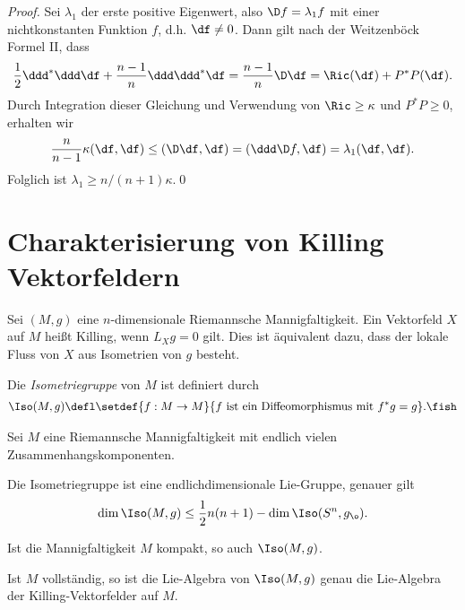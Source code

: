 \documentclass[%
	paper=a5,%
	fleqn,%
	DIV=18,%
	BCOR=0mm,
	fontsize=11pt,
	titlepage=false,%
	bibliography=totoc,
	DIV=18,%
	twoside=true,
	pdftitle=Riemannsche Geometrie,
	pdfauthor=Uwe Semmelmann,
	numbers=noendperiod]%
	{scrbook}
\begin{document}
\begin{proof}
Sei $\lambda_{1}$ der erste positive Eigenwert, also $\D f = \lambda_{1}f$ mit einer nichtkonstanten Funktion $f$, d.h. $\df \neq 0$. Dann gilt nach der Weitzenböck Formel II, dass
\begin{align*}
\frac{1}{2}\ddd^*\ddd\df + \frac{n-1}{n}\ddd\ddd^*\df = 
\frac{n-1}{n}\D\df = 
\Ric(\df) + P^*P(\df).
\end{align*}
Durch Integration dieser Gleichung und Verwendung von $\Ric \ge \kappa$ und $P^*P \ge 0$, erhalten wir
\begin{align*}
\frac{n}{n-1}\kappa(\df,\df) \le (\D\df,\df) = (\ddd\D f,\df) = \lambda_{1}(\df,\df).
\end{align*}
Folglich ist $\lambda_{1} \ge n/(n+1)\kappa$.\qed
\end{proof}

\section{Charakterisierung von Killing Vektorfeldern}

Sei $(M,g)$ eine $n$-dimensionale Riemannsche Mannigfaltigkeit. Ein Vektorfeld $X$ auf $M$ heißt Killing, wenn $L_{X}g = 0$ gilt. Dies ist äquivalent dazu, dass der lokale Fluss von $X$ aus Isometrien von $g$ besteht.

\begin{defn}
Die \emph{Isometriegruppe} von $M$ ist definiert durch
\begin{align*}
\Iso(M,g) \defl \setdef{f: M\to M}{f\text{ ist ein Diffeomorphismus mit }f^*g = g}.\fish
\end{align*}
\end{defn}

\begin{prop}
Sei $M$ eine Riemannsche Mannigfaltigkeit mit endlich vielen Zusammenhangskomponenten.
\begin{propenum}
\item 
Die Isometriegruppe ist eine endlichdimensionale Lie-Gruppe, genauer gilt
\begin{align*}
\dim \Iso(M,g) \le \frac{1}{2}n(n+1) - \dim \Iso(S^n,g_{\o}).
\end{align*}
\item Ist die Mannigfaltigkeit $M$ kompakt, so auch $\Iso(M,g)$.
\item Ist $M$ vollständig, so ist die Lie-Algebra von $\Iso(M,g)$ genau die Lie-Algebra der Killing-Vektorfelder auf $M$.\fish
\end{propenum}
\end{prop}
\end{document}

